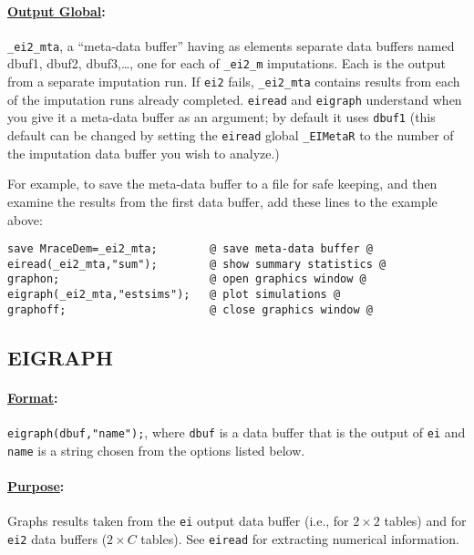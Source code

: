 \documentclass[11pt,titlepage]{article}
\begin{document}
\paragraph{\underline{Output Global}:}
\texttt{\_ei2\_mta}, a ``meta-data buffer'' having as elements
separate data buffers named dbuf1, dbuf2, dbuf3,\ldots, one for each
of \texttt{\_ei2\_m} imputations.  Each is the output from a separate
imputation run.  If \texttt{ei2} fails, \texttt{\_ei2\_mta} contains
results from each of the imputation runs already completed.
\texttt{eiread} and \texttt{eigraph} understand when you give it a
meta-data buffer as an argument; by default it uses \texttt{dbuf1}
(this default can be changed by setting the \texttt{eiread} global
\texttt{\_EIMetaR} to the number of the imputation data buffer you wish
to analyze.)

For example, to save the meta-data buffer to a file for safe keeping,
and then examine the results from the first data buffer, add these
lines to the example above:
\begin{verbatim}
save MraceDem=_ei2_mta;        @ save meta-data buffer @
eiread(_ei2_mta,"sum");        @ show summary statistics @
graphon;                       @ open graphics window @
eigraph(_ei2_mta,"estsims");   @ plot simulations @
graphoff;                      @ close graphics window @
\end{verbatim}

\subsection{EIGRAPH} \label{eigraph}

\paragraph{\underline{Format}:} \texttt{eigraph(dbuf,"name");}, where
\texttt{dbuf} is a data buffer that is the output of \texttt{ei} and
\texttt{name} is a string chosen from the options listed below.

\paragraph{\underline{Purpose}:}
Graphs results taken from the \texttt{ei} output data buffer (i.e.,
for $2\times 2$ tables) and for \texttt{ei2} data buffers ($2\times C$
tables).  See \texttt{eiread} for extracting numerical information.
\end{document}
